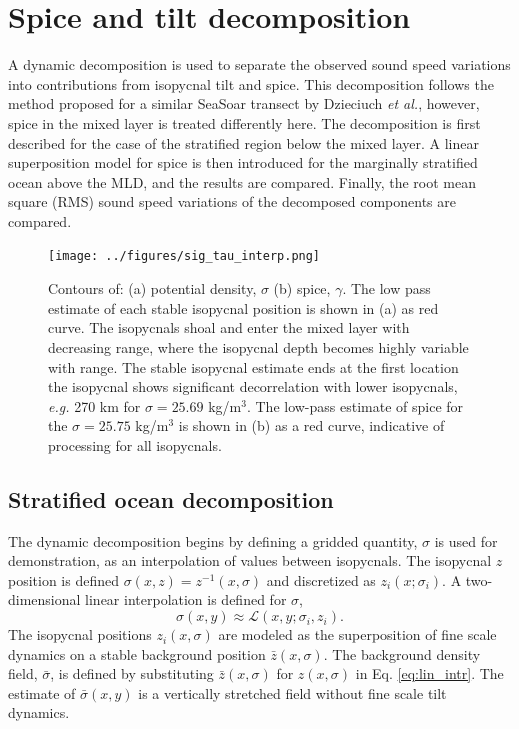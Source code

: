 \documentclass[preprint,NumberedRefs]{JASA}
\begin{document}
\section{\label{sec:decomposition}Spice and tilt decomposition}
A dynamic decomposition is used to separate the observed sound speed variations into contributions from isopycnal tilt and spice. This decomposition follows the method proposed for a similar SeaSoar transect by Dzieciuch \emph{et al.},\citep{dzieciuch2004} however, spice in the mixed layer is treated differently here. The decomposition is first described for the case of the stratified region below the mixed layer. A linear superposition model for spice is then introduced for the marginally stratified ocean above the MLD, and the results are compared. Finally, the root mean square (RMS) sound speed variations of the decomposed components are compared.

\begin{figure}
\texttt{[image: ../figures/sig\_tau\_interp.png]}
    \caption{\label{fig:cntrs}{Contours of: (a) potential density, $\sigma$ (b) spice, $\gamma$. The low pass estimate of each stable isopycnal position is shown in (a) as red curve. The isopycnals shoal and enter the mixed layer with decreasing range, where the isopycnal depth becomes highly variable with range. The stable isopycnal estimate ends at the first location the isopycnal shows significant decorrelation with lower isopycnals, \emph{e.g.} 270 km for $\sigma=25.69$ kg/m$^3$. The low-pass estimate of spice for the $\sigma=25.75$ kg/m$^3$ is shown in (b) as a red curve, indicative of processing for all isopycnals.}}
\end{figure}

\subsection{Stratified ocean decomposition}
The dynamic decomposition begins by defining a gridded quantity, $\sigma$ is used for demonstration, as an interpolation of values between isopycnals. The isopycnal $z$ position is defined $\sigma(x, z) = z^{-1}(x, \sigma)$ and discretized as $z_i(x; \sigma_i)$. A two-dimensional linear interpolation is defined for $\sigma$,
\begin{equation}
    \sigma(x,y)\approx\mathcal{L}(x, y; \sigma_i, z_i).
    \label{eq:lin_intr}
\end{equation}
The isopycnal positions $z_i(x, \sigma)$ are modeled as the superposition of fine scale dynamics on a stable background position $\bar{z}(x, \sigma)$. The background density field, $\bar{\sigma}$, is defined by substituting $\bar{z}(x, \sigma)$ for $z(x, \sigma)$ in Eq. \eqref{eq:lin_intr}. The estimate of $\bar{\sigma}(x,y)$ is a vertically stretched field without fine scale tilt dynamics.
\end{document}
